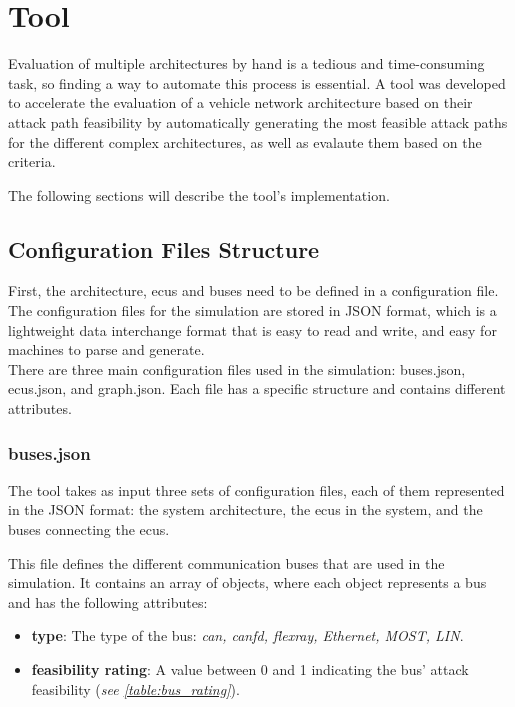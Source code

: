 \chapter{Tool}
\label{chp:tool}

Evaluation of multiple architectures by hand is a tedious and time-consuming task, so finding a way to automate this process is essential.
A tool was developed to accelerate the evaluation of a vehicle network architecture based on their attack path feasibility
by automatically generating the most feasible attack paths for the different complex architectures, as well as evalaute them based on the criteria.

The following sections will describe the tool's implementation.

\section{Configuration Files Structure}
\label{sec:config}

First, the architecture, \acrshort{ecu}s and buses need to be defined in a configuration file.
The configuration files for the simulation are stored in JSON format, 
which is a lightweight data interchange format that is easy to read and write, and easy for machines to parse and generate.\\

There are three main configuration files used in the simulation: buses.json, ecus.json, and graph.json.
Each file has a specific structure and contains different attributes.

\subsection{buses.json}
\label{sec:buses}

The tool takes as input three sets of configuration files, each of them represented in the JSON format: 
the system architecture, the \acrshort{ecu}s in the system, and the buses connecting the \acrshort{ecu}s. 

This file defines the different communication buses that are used in the simulation. 
It contains an array of objects, where each object represents a bus and has the following attributes:

\begin{itemize}
\item \textbf{type}: The type of the bus: \textit{\acrshort{can}, \acrshort{canfd}, \acrshort{flexray}, Ethernet, MOST, LIN}.
\item \textbf{feasibility rating}: A value between 0 and 1 indicating the bus' attack feasibility (\textit{see \ref{table:bus_rating}}).
\end{itemize}

